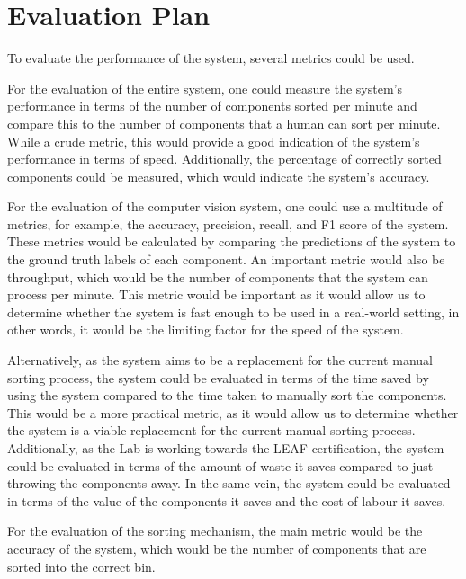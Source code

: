 \section{Evaluation Plan}
To evaluate the performance of the system, several metrics could be used.

For the evaluation of the entire system, one could measure the system's performance in terms of the number of components sorted per minute and compare
this to the number of components that a human can sort per minute. While a crude metric, this would provide a good indication of the system's performance
in terms of speed. Additionally, the percentage of correctly sorted components could be measured, which would indicate the system's accuracy.

For the evaluation of the computer vision system, one could use a multitude of metrics, for example, the accuracy, precision, recall, and F1 score of the
system. These metrics would be calculated by comparing the predictions of the system to the ground truth labels of each component. An important
metric would also be throughput, which would be the number of components that the system can process per minute. This metric would be important
as it would allow us to determine whether the system is fast enough to be used in a real-world setting, in other words, it would be the limiting factor
for the speed of the system.

Alternatively, as the system aims to be a replacement for the current manual sorting process, the system could be evaluated in terms of the time
saved by using the system compared to the time taken to manually sort the components. This would be a more practical metric, as it would allow us to
determine whether the system is a viable replacement for the current manual sorting process. Additionally, as the Lab is working towards the LEAF
certification, the system could be evaluated in terms of the amount of waste it saves compared to just throwing the components away. In the same vein,
the system could be evaluated in terms of the value of the components it saves and the cost of labour it saves.

For the evaluation of the sorting mechanism, the main metric would be the accuracy of the system, which would be the number of components that are
sorted into the correct bin.
